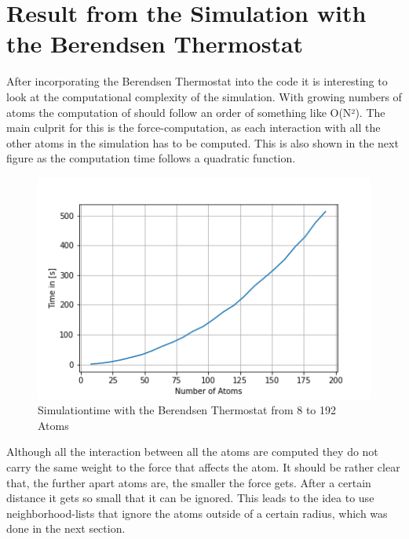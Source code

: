 \section{Result from the Simulation with the Berendsen Thermostat}

After incorporating the Berendsen Thermostat into the code it is interesting to look at the computational complexity of the simulation. With growing numbers of atoms the computation of should follow an order of something like O(N²). The main culprit for this is the force-computation, as each interaction with all the other atoms in the simulation has to be computed. This is also shown in the next figure as the computation time follows a quadratic function. 
\begin{figure}
	\begin{center}
		\includegraphics[scale=1]{Figure/plotAtomTimes.png}
	\end{center}
	\caption[Simulationtime with the Berendsen Thermostat from 8 to 192 Atoms]{Simulationtime with the Berendsen Thermostat from 8 to 192 Atoms }
	\label{PlotSimulationTimeBerendsenThermostat}
\end{figure}
Although all the interaction between all the atoms are computed they do not carry the same weight to the force that affects the atom. It should be rather clear that, the further apart atoms are, the smaller the force gets. After a certain distance it gets so small that it can be ignored. This leads to the idea to use neighborhood-lists that ignore the atoms outside of a certain radius, which was done in the next section.

